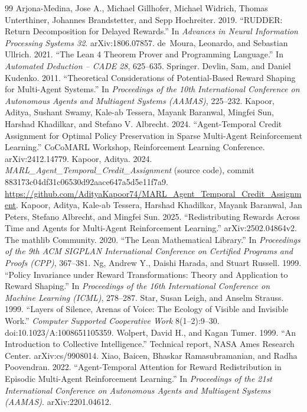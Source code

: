 \documentclass[11pt]{article}
\theoremstyle{remark}
\begin{document}
\begin{thebibliography}{99}
 Arjona-Medina, Jose A., Michael Gillhofer, Michael Widrich, Thomas Unterthiner, Johannes Brandstetter, and Sepp Hochreiter. 2019. ``RUDDER: Return Decomposition for Delayed Rewards.'' In \emph{Advances in Neural Information Processing Systems 32}. arXiv:1806.07857.
 de~Moura, Leonardo, and Sebastian Ullrich. 2021. ``The Lean 4 Theorem Prover and Programming Language.'' In \emph{Automated Deduction -- CADE 28}, 625--635. Springer.
 Devlin, Sam, and Daniel Kudenko. 2011. ``Theoretical Considerations of Potential-Based Reward Shaping for Multi-Agent Systems.'' In \emph{Proceedings of the 10th International Conference on Autonomous Agents and Multiagent Systems (AAMAS)}, 225--232.
 Kapoor, Aditya, Sushant Swamy, Kale-ab Tessera, Mayank Baranwal, Mingfei Sun, Harshad Khadilkar, and Stefano V. Albrecht. 2024. ``Agent-Temporal Credit Assignment for Optimal Policy Preservation in Sparse Multi-Agent Reinforcement Learning.'' CoCoMARL Workshop, Reinforcement Learning Conference. arXiv:2412.14779.
 Kapoor, Aditya. 2024. \emph{MARL\_Agent\_Temporal\_Credit\_Assignment} (source code), commit 883173c04df31c06530d92aace647a5d5e11f7a9. \url{https://github.com/AdityaKapoor74/MARL_Agent_Temporal_Credit_Assignment}.
 Kapoor, Aditya, Kale-ab Tessera, Harshad Khadilkar, Mayank Baranwal, Jan Peters, Stefano Albrecht, and Mingfei Sun. 2025. ``Redistributing Rewards Across Time and Agents for Multi-Agent Reinforcement Learning.'' arXiv:2502.04864v2.
 The mathlib Community. 2020. ``The Lean Mathematical Library.'' In \emph{Proceedings of the 9th ACM SIGPLAN International Conference on Certified Programs and Proofs (CPP)}, 367--381.
 Ng, Andrew Y., Daishi Harada, and Stuart Russell. 1999. ``Policy Invariance under Reward Transformations: Theory and Application to Reward Shaping.'' In \emph{Proceedings of the 16th International Conference on Machine Learning (ICML)}, 278--287.
 Star, Susan Leigh, and Anselm Strauss. 1999. ``Layers of Silence, Arenas of Voice: The Ecology of Visible and Invisible Work.'' \emph{Computer Supported Cooperative Work} 8(1--2):9--30. doi:10.1023/A:1008651105359.
 Wolpert, David H., and Kagan Tumer. 1999. ``An Introduction to Collective Intelligence.'' Technical report, NASA Ames Research Center. arXiv:cs/9908014.
 Xiao, Baicen, Bhaskar Ramasubramanian, and Radha Poovendran. 2022. ``Agent-Temporal Attention for Reward Redistribution in Episodic Multi-Agent Reinforcement Learning.'' In \emph{Proceedings of the 21st International Conference on Autonomous Agents and Multiagent Systems (AAMAS)}. arXiv:2201.04612.
\end{thebibliography}
\end{document}
